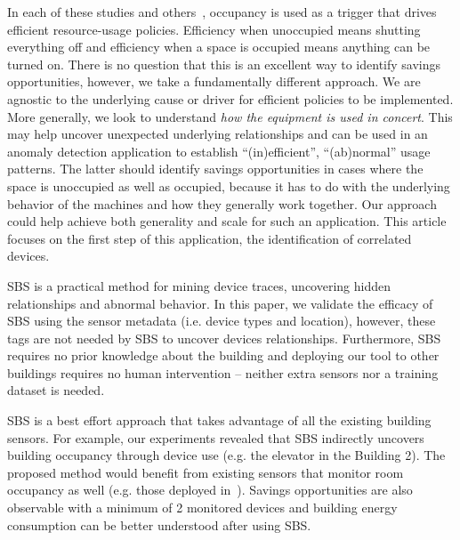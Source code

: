In each of these studies and others~\cite{kaminthermo, buildanomaly}, occupancy is used as a trigger
that drives efficient resource-usage policies.  Efficiency
when unoccupied means shutting everything off and efficiency when a space is occupied means anything
can be turned on.  There is no question that this is an excellent way to identify savings opportunities, however, we
take a fundamentally different approach.  We are agnostic to the underlying cause or driver for efficient
policies to be implemented.  More generally, we look to understand \emph{how the equipment is used in
concert}.  This may help uncover unexpected underlying relationships and can be used in an anomaly detection application
to establish ``(in)efficient'', ``(ab)normal'' usage patterns.  The latter 
should identify savings opportunities in cases where the space is unoccupied as well 
as occupied, because it has to do with the underlying behavior of the machines and how they generally work
together.  Our approach could help achieve both generality and scale for such an application.
This article focuses on the first step of this application, the identification of correlated devices.







SBS is a practical method for mining device traces, uncovering hidden relationships and abnormal behavior. 
In this paper, we validate the efficacy of SBS using the sensor metadata (i.e. device types and location), however, these 
tags are not needed by SBS to uncover devices relationships.
Furthermore, SBS requires no prior knowledge about the building and deploying our tool to other buildings requires no human intervention --
neither extra sensors nor a training dataset is needed. 

SBS is a best effort approach that takes advantage of all the existing building sensors.
For example, our experiments revealed that SBS indirectly uncovers building occupancy through device use (e.g. the elevator in the Building 2). 
The proposed method would benefit from existing sensors that monitor room occupancy as well (e.g. those deployed in~\cite{agarwal:ipsn2011,erickson:ipsn2011}).  %
Savings opportunities are also observable with a minimum of 2 monitored devices and building energy consumption can be better understood after using SBS.


